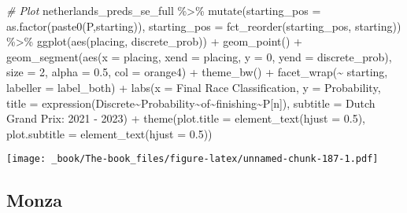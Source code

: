 \documentclass[
]{book}
\newenvironment{Shaded}{\begin{snugshade}}{\end{snugshade}}
\newcommand{\AttributeTok}[1]{\textcolor[rgb]{0.77,0.63,0.00}{#1}}
\newcommand{\CommentTok}[1]{\textcolor[rgb]{0.56,0.35,0.01}{\textit{#1}}}
\newcommand{\DecValTok}[1]{\textcolor[rgb]{0.00,0.00,0.81}{#1}}
\newcommand{\FloatTok}[1]{\textcolor[rgb]{0.00,0.00,0.81}{#1}}
\newcommand{\FunctionTok}[1]{\textcolor[rgb]{0.00,0.00,0.00}{#1}}
\newcommand{\NormalTok}[1]{#1}
\newcommand{\SpecialCharTok}[1]{\textcolor[rgb]{0.00,0.00,0.00}{#1}}
\newcommand{\StringTok}[1]{\textcolor[rgb]{0.31,0.60,0.02}{#1}}
\begin{document}
\begin{Shaded}
\begin{Highlighting}[]
\CommentTok{\# Plot}
\NormalTok{netherlands\_preds\_se\_full }\SpecialCharTok{\%\textgreater{}\%}
  \FunctionTok{mutate}\NormalTok{(}\AttributeTok{starting\_pos =} \FunctionTok{as.factor}\NormalTok{(}\FunctionTok{paste0}\NormalTok{(}\StringTok{\textquotesingle{}P\textquotesingle{}}\NormalTok{,starting)),}
         \AttributeTok{starting\_pos =} \FunctionTok{fct\_reorder}\NormalTok{(starting\_pos, starting)) }\SpecialCharTok{\%\textgreater{}\%}
  \FunctionTok{ggplot}\NormalTok{(}\FunctionTok{aes}\NormalTok{(placing, discrete\_prob)) }\SpecialCharTok{+}
  \FunctionTok{geom\_point}\NormalTok{() }\SpecialCharTok{+}
  \FunctionTok{geom\_segment}\NormalTok{(}\FunctionTok{aes}\NormalTok{(}\AttributeTok{x =}\NormalTok{ placing, }\AttributeTok{xend =}\NormalTok{ placing, }\AttributeTok{y =} \DecValTok{0}\NormalTok{, }\AttributeTok{yend =}\NormalTok{ discrete\_prob),}
               \AttributeTok{size =} \DecValTok{2}\NormalTok{, }\AttributeTok{alpha =} \FloatTok{0.5}\NormalTok{, }\AttributeTok{col =} \StringTok{\textquotesingle{}orange4\textquotesingle{}}\NormalTok{) }\SpecialCharTok{+}
  \FunctionTok{theme\_bw}\NormalTok{() }\SpecialCharTok{+}
  \FunctionTok{facet\_wrap}\NormalTok{(}\SpecialCharTok{\textasciitilde{}}\NormalTok{ starting, }\AttributeTok{labeller =}\NormalTok{ label\_both) }\SpecialCharTok{+}
  \FunctionTok{labs}\NormalTok{(}\AttributeTok{x =} \StringTok{\textquotesingle{}Final Race Classification\textquotesingle{}}\NormalTok{,}
       \AttributeTok{y =} \StringTok{\textquotesingle{}Probability\textquotesingle{}}\NormalTok{,}
       \AttributeTok{title =} \FunctionTok{expression}\NormalTok{(Discrete}\SpecialCharTok{\textasciitilde{}}\NormalTok{Probability}\SpecialCharTok{\textasciitilde{}}\NormalTok{of}\SpecialCharTok{\textasciitilde{}}\NormalTok{finishing}\SpecialCharTok{\textasciitilde{}}\NormalTok{P[n]),}
       \AttributeTok{subtitle =} \StringTok{\textquotesingle{}Dutch Grand Prix: 2021 {-} 2023\textquotesingle{}}\NormalTok{) }\SpecialCharTok{+}
  \FunctionTok{theme}\NormalTok{(}\AttributeTok{plot.title =} \FunctionTok{element\_text}\NormalTok{(}\AttributeTok{hjust =} \FloatTok{0.5}\NormalTok{),}
        \AttributeTok{plot.subtitle =} \FunctionTok{element\_text}\NormalTok{(}\AttributeTok{hjust =} \FloatTok{0.5}\NormalTok{)) }
\end{Highlighting}
\end{Shaded}

\texttt{[image: \_book/The-book\_files/figure-latex/unnamed-chunk-187-1.pdf]}

\hypertarget{monza}{%
\subsection{Monza}\label{monza}}
\end{document}
